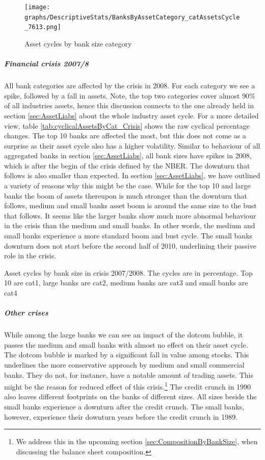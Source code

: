 \documentclass[12pt, a4paper]{article} %
\begin{document}
\begin{figure}[H]
\begin{minipage}{\textwidth}
\texttt{[image: graphs/DescriptiveStats/BanksByAssetCategory\_catAssetsCycle\_7613.png]}
\centering
\caption[1]{Asset cycles by bank size category}
\label{fig:catassetscycle}
\end{minipage}
\end{figure}

\subparagraph{Financial crisis 2007/8}
All bank categories are affected by the crisis in 2008. For each category we see a spike, followed by a fall in assets. Note, the top two categories cover almost $90\%$ of all industries assets, hence this discussion connects to the one already held in section \ref{sec:AssetLiabs} about the whole industry asset cycle.
For a more detailed view, table \ref{tab:cyclicalAssetsByCat_Crisis} shows the raw cyclical percentage changes.
The top 10 banks are affected the most, but this does not come as a surprise as their asset cycle also has a higher volatility. Similar to behaviour of all aggregated banks in section \ref{sec:AssetLiabs}, all bank sizes have spikes in 2008, which is after the begin of the crisis defined by the NBER. The downturn that follows is also smaller than expected. In section \ref{sec:AssetLiabs}, we have outlined a variety of reasons why this might be the case. While for the top 10 and large banks the boom of assets thereupon is much stronger than the downturn that follows, medium and small banks asset boom is around the same size to the bust that follows. It seems like the larger banks show much more abnormal behaviour in the crisis than the medium and small banks. In other words, the medium and small banks experience a more standard boom and bust cycle.
The small banks downturn does not start before the second half of 2010, underlining their passive role in the crisis.


\begin{table}[H]
\begin{minipage}{\textwidth}

\caption[1]{Asset cycles by bank size in crisis 2007/2008. The cycles are in percentage. Top 10 are cat1, large banks are cat2, medium banks are cat3 and small banks are cat4}
\label{tab:cyclicalAssetsByCat_Crisis}
\end{minipage}
\end{table}

\subparagraph{Other crises}
While among the large banks we can see an impact of the dotcom bubble, it passes the medium and small banks with almost no effect on their asset cycle. The dotcom bubble is marked by a significant fall in value among stocks. 
This underlines the more conservative approach by medium and small commercial banks. They do not, for instance, have a notable amount of trading assets. This might be the reason for reduced effect of this crisis.\footnote{We address this in the upcoming section \ref{sec:CompositionByBankSize}, when discussing the balance sheet composition.}
The credit crunch in 1990 also leaves different footprints on the banks of different sizes. All sizes beside the small banks experience a downturn after the credit crunch. The small banks, however, experience their downturn years before the credit crunch in 1989. 
\end{document}
